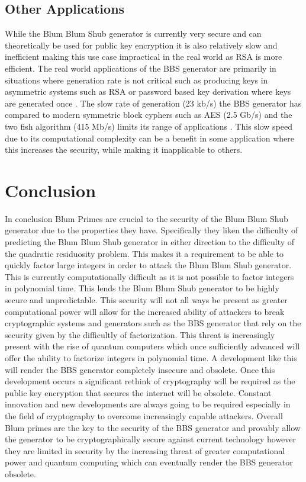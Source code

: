\documentclass{article}
\begin{document}
\subsection{Other Applications}

While the Blum Blum Shub generator is currently very secure and can theoretically be used for public key encryption it is also relatively slow and inefficient making this use case impractical in the real world as RSA is more efficient. The real world applications of the BBS generator are primarily in situations where generation rate is not critical such as producing keys in asymmetric systems such as RSA or password based key derivation where keys are generated once \cite{Vybornova2017}. The slow rate of generation (23 kb/s) the BBS generator has compared to modern symmetric block cyphers such as AES (2.5 Gb/s) and the two fish algorithm (415 Mb/s) limits its range of applications \cite{Vybornova2017}. This slow speed due to its computational complexity can be a benefit in some application where this increases the security, while making it inapplicable to others.

\section{Conclusion}

In conclusion Blum Primes are crucial to the security of the Blum Blum Shub generator due to the properties they have. Specifically they liken the difficulty of predicting the Blum Blum Shub generator in either direction to the difficulty of the quadratic residuosity problem. This makes it a requirement to be able to quickly factor large integers in order to attack the Blum Blum Shub generator. This is currently computationally difficult as it is not possible to factor integers in polynomial time. This lends the Blum Blum Shub generator to be highly secure and unpredictable. This security will not all ways be present as greater computational power will allow for the increased ability of attackers to break cryptographic systems and generators such as the BBS generator that rely on the security given by the difficultly of factorization. This threat is increasingly present with the rise of quantum computers which once sufficiently advanced will offer the ability to factorize integers in polynomial time. A development like this will render the BBS generator completely insecure and obsolete. Once this development occurs a significant rethink of cryptography will be required as the public key encryption that secures the internet will be obsolete. Constant innovation and new developments are always going to be required especially in the field of cryptography to overcome increasingly capable attackers. Overall Blum primes are the key to the security of the BBS generator and provably allow the generator to be cryptographically secure against current technology however they are limited in security by the increasing threat of greater computational power and quantum computing which can eventually render the BBS generator obsolete.
\end{document}
